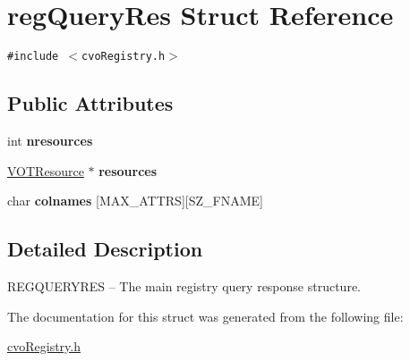 \hypertarget{structregQueryRes}{
\section{regQueryRes Struct Reference}
\label{structregQueryRes}
}
{\tt \#include $<$cvoRegistry.h$>$}

\subsection*{Public Attributes}
\begin{CompactItemize}
\item 
\hypertarget{structregQueryRes_d946084cbbe5af4402b428ceb7aac422}{
int \textbf{nresources}}
\label{structregQueryRes_d946084cbbe5af4402b428ceb7aac422}

\item 
\hypertarget{structregQueryRes_59178d2941531cc32eb253c202b113ff}{
\hyperlink{structVOTResource}{VOTResource} $\ast$ \textbf{resources}}
\label{structregQueryRes_59178d2941531cc32eb253c202b113ff}

\item 
\hypertarget{structregQueryRes_251cf37be17f1d70061c028f76a8b215}{
char \textbf{colnames} \mbox{[}MAX\_\-ATTRS\mbox{]}\mbox{[}SZ\_\-FNAME\mbox{]}}
\label{structregQueryRes_251cf37be17f1d70061c028f76a8b215}

\end{CompactItemize}


\subsection{Detailed Description}
REGQUERYRES -- The main registry query response structure. 

The documentation for this struct was generated from the following file:\begin{CompactItemize}
\item 
\hyperlink{cvoRegistry_8h}{cvoRegistry.h}\end{CompactItemize}
